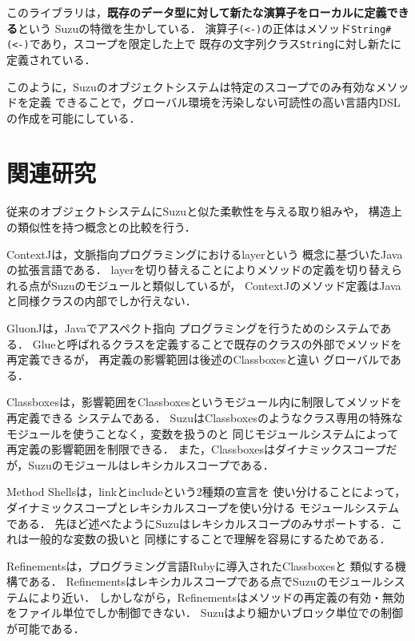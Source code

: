 \documentclass{ipsjprosym}
\begin{document}
このライブラリは，\textbf{既存のデータ型に対して新たな演算子をローカルに定義できる}という
Suzuの特徴を生かしている．
演算子\verb|(<-)|の正体はメソッド\verb|String#(<-)|であり，スコープを限定した上で
既存の文字列クラス\verb|String|に対し新たに定義されている．

このように，Suzuのオブジェクトシステムは特定のスコープでのみ有効なメソッドを定義
できることで，グローバル環境を汚染しない可読性の高い言語内DSLの作成を可能にしている．

\section{関連研究}

従来のオブジェクトシステムにSuzuと似た柔軟性を与える取り組みや，
構造上の類似性を持つ概念との比較を行う．

ContextJ\cite{AppeltauerMalte:2011}は，文脈指向プログラミングにおけるlayerという
概念に基づいたJavaの拡張言語である．
layerを切り替えることによりメソッドの定義を切り替えられる点がSuzuのモジュールと類似しているが，
ContextJのメソッド定義はJavaと同様クラスの内部でしか行えない．

GluonJ\cite{Chiba:2010:MMC:1869459.1869503}は，Javaでアスペクト指向
プログラミングを行うためのシステムである．
Glueと呼ばれるクラスを定義することで既存のクラスの外部でメソッドを再定義できるが，
再定義の影響範囲は後述のClassboxes\cite{Bergel:2005:CCV:1646591.1646599}と違い
グローバルである．

Classboxesは，影響範囲をClassboxesというモジュール内に制限してメソッドを再定義できる
システムである．
SuzuはClassboxesのようなクラス専用の特殊なモジュールを使うことなく，変数を扱うのと
同じモジュールシステムによって再定義の影響範囲を制限できる．
また，Classboxesはダイナミックスコープだが，Suzuのモジュールはレキシカルスコープである．

Method Shells\cite{Takeshita:2014-07-14}は，linkとincludeという2種類の宣言を
使い分けることによって，ダイナミックスコープとレキシカルスコープを使い分ける
モジュールシステムである．
先ほど述べたようにSuzuはレキシカルスコープのみサポートする．これは一般的な変数の扱いと
同様にすることで理解を容易にするためである．

Refinements\cite{Maeda:2013}は，プログラミング言語Rubyに導入されたClassboxesと
類似する機構である．
Refinementsはレキシカルスコープである点でSuzuのモジュールシステムにより近い．
しかしながら，Refinementsはメソッドの再定義の有効・無効をファイル単位でしか制御できない．
Suzuはより細かいブロック単位での制御が可能である．
\end{document}
